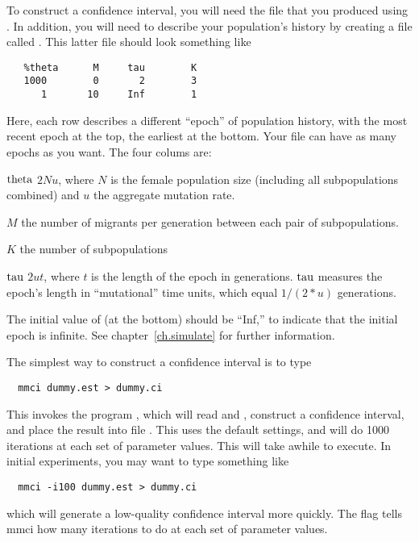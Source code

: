 To construct a confidence interval, you will need the file
 that you produced using .  In addition, you
will need to describe your population's history by creating a file
called .  This latter file should look something like
\begin{verbatim}
   %theta      M     tau        K
   1000        0       2        3
      1       10     Inf        1
\end{verbatim}
Here, each row describes a different ``epoch'' of population history,
with the most recent epoch at the top, the earliest at the bottom.
Your file can have as many epochs as you want.  The four colums are:
\begin{definition}
\item[$\hbox{theta}$]$2Nu$, where $N$ is the female population size
      (including all subpopulations combined) and $u$ the aggregate
      mutation rate.

\item[$M$]the number of migrants per generation between each pair of  
       subpopulations.

\item[$K$]the number of subpopulations
 
\item[$\hbox{tau}$]$2ut$, where $t$ is the length of the epoch in
      generations.  $\hbox{tau}$ measures the epoch's length in
      ``mutational'' time units, which equal $1/(2*u)$ generations.
\end{definition}
The initial value of  (at the bottom) should be ``Inf,'' to
indicate that the initial epoch is infinite.  See
chapter~\ref{ch.simulate} for further information.

The simplest way to construct a confidence interval is to type
\begin{verbatim}
  mmci dummy.est > dummy.ci
\end{verbatim}
This invokes the program , which will read  and
, construct a confidence interval, and place the
result into file .  This uses the default settings, and
will do 1000 iterations at each set of parameter values.  This will
take awhile to execute.  In initial experiments, you may want to type
something like
\begin{verbatim}
  mmci -i100 dummy.est > dummy.ci
\end{verbatim}
which will generate a low-quality confidence interval more quickly.
The  flag tells mmci how many iterations to do at each set of
parameter values.

